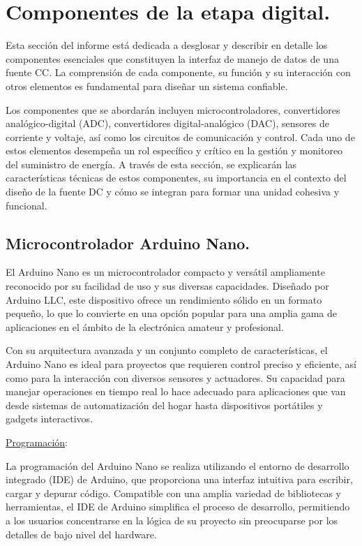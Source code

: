 \section{Componentes de la etapa digital.}
Esta sección del informe está dedicada a desglosar y describir en detalle los componentes esenciales que constituyen la interfaz de manejo de datos de una fuente CC. La comprensión de cada componente, su función y su interacción con otros elementos es fundamental para diseñar un sistema confiable.\par 
Los componentes que se abordarán incluyen microcontroladores, convertidores analógico-digital (ADC), convertidores digital-analógico (DAC), sensores de corriente y voltaje, así como los circuitos de comunicación y control. Cada uno de estos elementos desempeña un rol específico y crítico en la gestión y monitoreo del suministro de energía. A través de esta sección, se explicarán las características técnicas de estos componentes, su importancia en el contexto del diseño de la fuente DC y cómo se integran para formar una unidad cohesiva y funcional.

\subsection{Microcontrolador Arduino Nano.}
El Arduino Nano es un microcontrolador compacto y versátil ampliamente reconocido por su facilidad de uso y sus diversas capacidades. Diseñado por Arduino LLC, este dispositivo ofrece un rendimiento sólido en un formato pequeño, lo que lo convierte en una opción popular para una amplia gama de aplicaciones en el ámbito de la electrónica amateur y profesional.\par 
Con su arquitectura avanzada y un conjunto completo de características, el Arduino Nano es ideal para proyectos que requieren control preciso y eficiente, así como para la interacción con diversos sensores y actuadores. Su capacidad para manejar operaciones en tiempo real lo hace adecuado para aplicaciones que van desde sistemas de automatización del hogar hasta dispositivos portátiles y gadgets interactivos.

\underline{Programación}: \par 
La programación del Arduino Nano se realiza utilizando el entorno de desarrollo integrado (IDE) de Arduino, que proporciona una interfaz intuitiva para escribir, cargar y depurar código. Compatible con una amplia variedad de bibliotecas y herramientas, el IDE de Arduino simplifica el proceso de desarrollo, permitiendo a los usuarios concentrarse en la lógica de su proyecto sin preocuparse por los detalles de bajo nivel del hardware.


